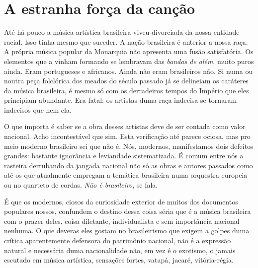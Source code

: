 \part{A estranha força da canção}



Até há pouco a música artística brasileira viveu divorciada da nossa
entidade racial. Isso tinha mesmo que suceder. A nação brasileira é
anterior a nossa raça. A própria música popular da Monarquia não
apresenta uma fusão satisfatória. Os elementos que a vinham formando se
lembravam das \emph{bandas de além}, muito puros ainda. Eram portugueses
e africanos. Ainda não eram brasileiros não. Si numa ou noutra peça
folclórica dos meados do século passado já se delineiam os caráteres da
música brasileira, é mesmo só com os derradeiros tempos do Império que
eles principiam abundante. Era fatal: os artistas duma raça indecisa se
tornaram indecisos que nem ela.

O que importa é saber se a obra desses artistas deve de ser contada como
valor nacional. Acho incontestável que sim. Esta verificação até parece
ociosa, mas pro meio moderno brasileiro sei que não
é. Nós, modernos, manifestamos dois defeitos grandes:
bastante ignorância e leviandade sistematizada. É comum entre nós a
rasteira derrubando da jangada nacional não só as obras e autores
passados como até os que atualmente empregam a temática brasileira numa
orquestra europeia ou no quarteto de cordas. \emph{Não é brasileiro}, se fala.

É que os modernos, ciosos da curiosidade exterior de muitos dos
documentos populares nossos, confundem o destino dessa coisa séria que é
a música brasileira com o prazer deles, coisa diletante, individualista
e sem importância nacional nenhuma. O que deveras eles gostam no
brasileirismo que exigem a golpes duma crítica aparentemente defensora
do patrimônio nacional, não é a expressão natural e necessária duma
nacionalidade não, em vez é o exotismo, o jamais escutado em música
artística, sensações fortes, vatapá, jacaré, vitória-régia.


